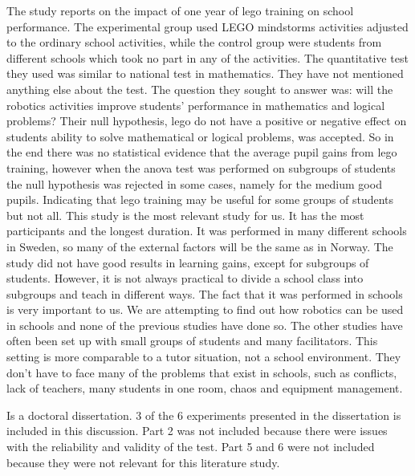 \bigskip\noindent
\cite{lindh2007does} The study reports on the impact of one year of lego training on school performance. The experimental group used LEGO mindstorms activities adjusted to the ordinary school activities, while the control group were students from different schools which took no part in any of the activities. The quantitative test they used was similar to national test in mathematics. They have not mentioned anything else about the test. The question they sought to answer was: will the robotics activities improve students’ performance in mathematics and logical problems? Their null hypothesis, lego do not have a positive or negative effect on students ability to solve mathematical or logical problems, was accepted. So in the end there was no statistical evidence that the average pupil gains from lego training, however when the anova test was performed on subgroups of students the null hypothesis was rejected in some cases, namely for the medium good pupils. Indicating that lego training may be useful for some groups of students but not all. This study is the most relevant study for us. It has the most participants and the longest duration. It was performed in many different schools in Sweden, so many of the external factors will be the same as in Norway. The study did not have good results in learning gains, except for subgroups of students. However, it is not always practical to divide a school class into subgroups and teach in different ways. The fact that it was performed in schools is very important to us. We are attempting to find out how robotics can be used in schools and none of the previous studies have done so. The other studies have often been set up with small groups of students and many facilitators. This setting is more comparable to a tutor situation, not a school environment. They don’t have to face many of the problems that exist in schools, such as conflicts, lack of teachers, many students in one room, chaos and equipment management. 

\bigskip\noindent
\cite{silk2011resources} Is a doctoral dissertation. 3 of the 6 experiments presented in the dissertation is included in this discussion. Part 2 was not included because there were issues with the reliability and validity of the test. Part 5 and 6 were not included because they were not relevant for this literature study.

